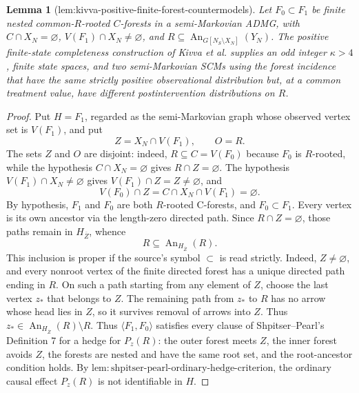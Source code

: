 \documentclass{article}
\newtheorem{lemma}{Lemma}
\begin{document}
\begin{lemma}[lem:kivva-positive-finite-forest-countermodels]\label{lem:kivva-positive-finite-forest-countermodels}
Let \(F_0\subset F_1\) be finite nested common-\(R\)-rooted \(C\)-forests in a semi-Markovian ADMG, with \(C\cap X_N=\varnothing\), \(V(F_1)\cap X_N\ne\varnothing\), and \(R\subseteq\operatorname{An}_{G[N_S\setminus X_N]}(Y_N)\). The positive finite-state completeness construction of Kivva et al. supplies an odd integer \(\kappa>4\), finite state spaces, and two semi-Markovian SCMs using the forest incidence that have the same strictly positive observational distribution but, at a common treatment value, have different postintervention distributions on \(R\).
\end{lemma}
\begin{proof}
Put \(H=F_1\), regarded as the semi-Markovian graph whose observed vertex set is \(V(F_1)\), and put
\[
 Z=X_N\cap V(F_1),\qquad O=R.
\]
The sets \(Z\) and \(O\) are disjoint: indeed, \(R\subseteq C=V(F_0)\) because \(F_0\) is \(R\)-rooted, while the hypothesis \(C\cap X_N=\varnothing\) gives \(R\cap Z=\varnothing\). The hypothesis \(V(F_1)\cap X_N\ne\varnothing\) gives \(V(F_1)\cap Z=Z\ne\varnothing\), and
\[
 V(F_0)\cap Z=C\cap X_N\cap V(F_1)=\varnothing.
\]
By hypothesis, \(F_1\) and \(F_0\) are both \(R\)-rooted C-forests, and \(F_0\subset F_1\). Every vertex is its own ancestor via the length-zero directed path. Since \(R\cap Z=\varnothing\), those paths remain in \(H_{\overline Z}\), whence
\[
 R\subseteq\operatorname{An}_{H_{\overline Z}}(R).
\]
This inclusion is proper if the source's symbol \(\subset\) is read strictly. Indeed, \(Z\ne\varnothing\), and every nonroot vertex of the finite directed forest has a unique directed path ending in \(R\). On such a path starting from any element of \(Z\), choose the last vertex \(z_*\) that belongs to \(Z\). The remaining path from \(z_*\) to \(R\) has no arrow whose head lies in \(Z\), so it survives removal of arrows into \(Z\). Thus \(z_*\in\operatorname{An}_{H_{\overline Z}}(R)\setminus R\).
Thus \(\langle F_1,F_0\rangle\) satisfies every clause of Shpitser--Pearl's Definition 7 for a hedge for \(P_z(R)\): the outer forest meets \(Z\), the inner forest avoids \(Z\), the forests are nested and have the same root set, and the root-ancestor condition holds. By \(\mathrm{lem:shpitser\text{-}pearl\text{-}ordinary\text{-}hedge\text{-}criterion}\), the ordinary causal effect \(P_z(R)\) is not identifiable in \(H\).


\end{proof}
\end{document}

